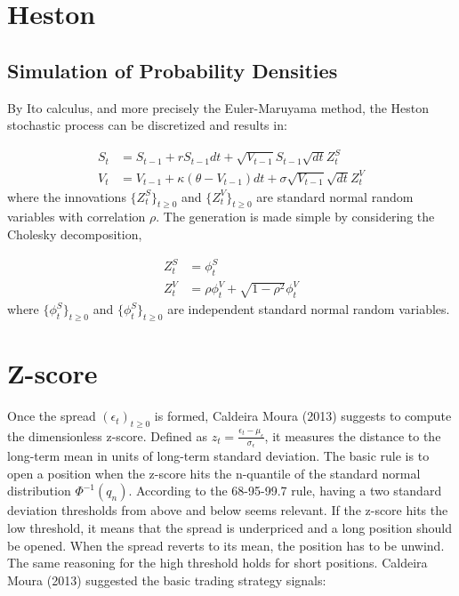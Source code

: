 \documentclass[11pt,a4,twosided,singlespacing,titlepagenumber=on]{scrreprt}
\numberwithin{equation}{chapter} %
\theoremstyle{remark}
\begin{document}
\section{Heston}
\subsection{Simulation of Probability Densities}
By Ito calculus, and more precisely the Euler-Maruyama method, the Heston stochastic process can be discretized and results in:

\begin{align*}
S_t &= S_{t-1} + r S_{t-1} dt + \sqrt{V_{t-1}}S_{t-1} \sqrt{dt}Z_t^S \\
V_t &= V_{t-1} + \kappa(\theta - V_{t-1})dt + \sigma \sqrt{V_{t-1}} \sqrt{dt} Z_t^V
\end{align*}
where the innovations $\{Z_t^S\}_{t \geq 0}$ and $\{Z_t^V\}_{t \geq 0}$ are standard normal random variables with correlation $\rho$. The generation is made simple by considering the Cholesky decomposition,

\begin{align*}
Z_t^S &= \phi_t^S \\
Z_t^V &= \rho \phi_t^V + \sqrt{1-\rho^2} \phi_t^V
\end{align*}
where $\{\phi_t^S\}_{t \geq 0}$ and $\{\phi_t^S\}_{t \geq 0}$ are independent standard normal random variables.

\section{Z-score}
Once the spread $(\epsilon_t)_{t \geq 0}$ is formed, Caldeira Moura (2013) suggests to compute the dimensionless z-score. Defined as $z_t = \frac{\epsilon_t-\mu_\epsilon}{\sigma_\epsilon}$, it measures the distance to the long-term mean in units of long-term standard deviation. The basic rule is to open a position when the z-score hits the n-quantile of the standard normal distribution $\Phi^{-1}(q_n)$. According to the 68-95-99.7 rule, having a two standard deviation thresholds from above and below seems relevant. If the z-score hits the low threshold, it means that the spread is underpriced and a long position should be opened. When the spread reverts to its mean, the position has to be unwind. The same reasoning for the high threshold holds for short positions. Caldeira Moura (2013) suggested the basic trading strategy signals:
\end{document}
